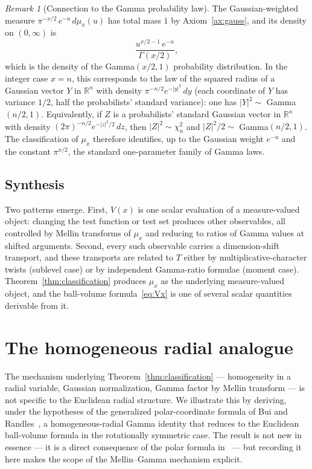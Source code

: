 \documentclass[11pt,a4paper]{article}
\theoremstyle{plain}
\theoremstyle{definition}
\theoremstyle{remark}
\newtheorem{remark}[theorem]{Remark}
\newcommand{\R}{\mathbb{R}}
\begin{document}
\begin{remark}[Connection to the Gamma probability law]\label{rmk:gamma-law}
The Gaussian-weighted measure $\pi^{-x/2}\,e^{-u}\,d\mu_x(u)$ has total mass $1$ by Axiom~\ref{ax:gauss}, and its density on $(0,\infty)$ is
\[
\frac{u^{x/2-1}\,e^{-u}}{\Gamma(x/2)},
\]
which is the density of the Gamma$(x/2,1)$ probability distribution. In the integer case $x=n$, this corresponds to the law of the squared radius of a Gaussian vector $Y$ in $\R^n$ with density $\pi^{-n/2}e^{-|y|^2}\,dy$ (each coordinate of $Y$ has variance $1/2$, half the probabilists' standard variance): one has $|Y|^2\sim$ Gamma$(n/2,1)$. Equivalently, if $Z$ is a probabilists' standard Gaussian vector in $\R^n$ with density $(2\pi)^{-n/2}e^{-|z|^2/2}\,dz$, then $|Z|^2\sim\chi^2_n$ and $|Z|^2/2\sim$ Gamma$(n/2,1)$. The classification of $\mu_x$ therefore identifies, up to the Gaussian weight $e^{-u}$ and the constant $\pi^{x/2}$, the standard one-parameter family of Gamma laws.
\end{remark}

\subsection*{Synthesis}

Two patterns emerge. First, $V(x)$ is one scalar evaluation of a measure-valued object: changing the test function or test set produces other observables, all controlled by Mellin transforms of $\mu_x$ and reducing to ratios of Gamma values at shifted arguments. Second, every such observable carries a dimension-shift transport, and these transports are related to $T$ either by multiplicative-character twists (sublevel case) or by independent Gamma-ratio formulae (moment case). Theorem~\ref{thm:classification} produces $\mu_x$ as the underlying measure-valued object, and the ball-volume formula~\eqref{eq:Vx} is one of several scalar quantities derivable from it.

\section{The homogeneous radial analogue}\label{sec:homogeneous}

The mechanism underlying Theorem~\ref{thm:classification} — homogeneity in a radial variable, Gaussian normalization, Gamma factor by Mellin transform — is not specific to the Euclidean radial structure. We illustrate this by deriving, under the hypotheses of the generalized polar-coordinate formula of Bui and Randles~\cite{BuiRandles2022}, a homogeneous-radial Gamma identity that reduces to the Euclidean ball-volume formula in the rotationally symmetric case. The result is not new in essence — it is a direct consequence of the polar formula in~\cite{BuiRandles2022} — but recording it here makes the scope of the Mellin--Gamma mechanism explicit.
\end{document}
